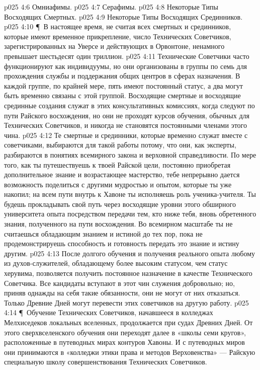 \vs p025 4:6 \bibnobreakspace Омниафимы.
\vs p025 4:7 \bibnobreakspace Серафимы.
\vs p025 4:8 \bibnobreakspace Некоторые Типы Восходящих Смертных.
\vs p025 4:9 \bibnobreakspace Некоторые Типы Восходящих Срединников.
\vs p025 4:10 \P\ В настоящее время, не считая всех смертных и срединников, которые имеют временное прикрепление, число Технических Советчиков, зарегистрированных на Уверсе и действующих в Орвонтоне, ненамного превышает шестьдесят один триллион.
\vs p025 4:11 Технические Советчики часто функционируют как индивидуумы, но они организованы в группы по семь для прохождения службы и поддержания общих центров в сферах назначения. В каждой группе, по крайней мере, пять имеют постоянный статус, а два могут быть временно связаны с этой группой. Восходящие смертные и восходящие срединные создания служат в этих консультативных комиссиях, когда следуют по пути Райского восхождения, но они не проходят курсов обучения, обычных для Технических Советчиков, и никогда не становятся постоянными членами этого чина.
\vs p025 4:12 Те смертные и срединники, которые временно служат вместе с советчиками, выбираются для такой работы потому, что они, как эксперты, разбираются в понятиях всемирного закона и верховной справедливости. По мере того, как ты путешествуешь к твоей Райской цели, постоянно приобретая дополнительное знание и возрастающее мастерство, тебе непрерывно дается возможность поделиться с другими мудростью и опытом, которые ты уже накопил; на всем пути внутрь к Хавоне ты исполняешь роль ученика\hyp{}учителя. Ты будешь прокладывать свой путь через восходящие уровни этого обширного университета опыта посредством передачи тем, кто ниже тебя, вновь обретенного знания, полученного на пути восхождения. Во всемирном масштабе ты не считаешься обладающим знанием и истиной до тех пор, пока не продемонстрируешь способность и готовность передать это знание и истину другим.
\vs p025 4:13 После долгого обучения и получения реального опыта любому из духов\hyp{}служителей, обладающему более высоким статусом, чем статус херувима, позволяется получить постоянное назначение в качестве Технического Советчика. Все кандидаты вступают в этот чин служения добровольно; но, приняв однажды на себя такие обязанности, они не могут от них отказаться. Только Древние Дней могут перевести этих советчиков на другую работу.
\vs p025 4:14 \P\ Обучение Технических Советчиков, начавшееся в колледжах Мелхиседеков локальных вселенных, продолжается при судах Древних Дней. От этого сверхвселенского обучения они переходят далее в «школы семи кругов», расположенные в путеводных мирах контуров Хавоны. И с путеводных миров они принимаются в «колледжи этики права и методов Верховенства» --- Райскую специальную школу совершенствования Технических Советчиков.
